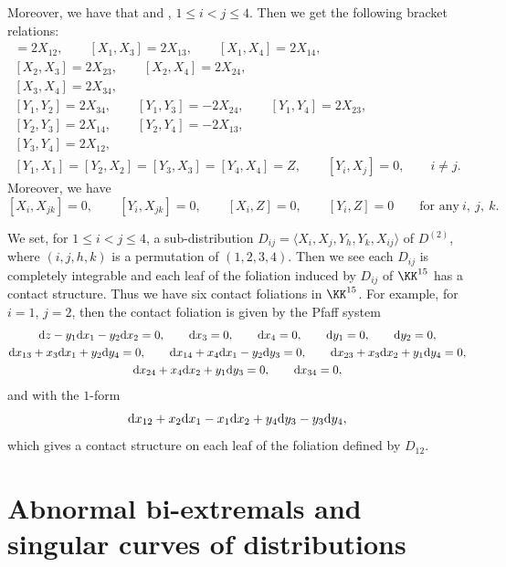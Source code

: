 Moreover, we have that
 and , $1 \leq i < j \leq 4$.
Then we get the following bracket relations:
\begin{gather*}
[X_1, X_2] = 2X_{12},\qquad [X_1, X_3] = 2X_{13},\qquad [X_1, X_4] = 2X_{14},
\\
 [X_2, X_3] = 2X_{23},\qquad [X_2, X_4] = 2X_{24},
\\
 [X_3, X_4] = 2X_{34},
\\
[Y_1, Y_2] = 2X_{34},\qquad [Y_1, Y_3] = -2X_{24},\qquad [Y_1, Y_4] = 2X_{23},
\\
 [Y_2, Y_3] = 2X_{14},\qquad [Y_2, Y_4] = -2X_{13},
\\
 [Y_3, Y_4] = 2X_{12},
\\
[Y_1, X_1] = [Y_2, X_2] = [Y_3, X_3] = [Y_4, X_4] = Z, \qquad [Y_i, X_j] = 0, \qquad i \not= j.
\end{gather*}
Moreover, we have
\[
[X_i, X_{jk}] = 0, \qquad [Y_i, X_{jk}] = 0, \qquad [X_i, Z] = 0, \qquad [Y_i, Z] = 0 \qquad \text{for any} \ i, \ j, \ k.
\]

\begin{Remark}
We set, for $1 \leq i < j \leq 4$, a sub-distribution
$D_{ij} = \langle X_i, X_j, Y_h, Y_k, X_{ij}\rangle$ of $D^{(2)}$, where $(i, j, h, k)$ is a permutation of $(1, 2, 3, 4)$.
Then we see each $D_{ij}$ is completely integrable
and each leaf of the foliation induced by $D_{ij}$ of $\KK^{15}$ has a contact structure.
Thus we have six contact foliations in $\KK^{15}$.
For example, for $i = 1$, $j = 2$, then the contact foliation is given by the Pfaff system
\begin{gather*}
{\rm d}z - y_1{\rm d}x_1 - y_2{\rm d}x_2 = 0,\qquad {\rm d}x_3 = 0,\qquad {\rm d}x_4 = 0,\qquad {\rm d}y_1 = 0,\qquad {\rm d}y_2 = 0,
\\
{\rm d}x_{13} + x_3{\rm d}x_1 + y_2{\rm d}y_4 = 0,\qquad {\rm d}x_{14} + x_4{\rm d}x_1 - y_2{\rm d}y_3 = 0,\qquad
{\rm d}x_{23} + x_3{\rm d}x_2 + y_1{\rm d}y_4 = 0,
\\
{\rm d}x_{24} + x_4{\rm d}x_2 + y_1{\rm d}y_3 = 0,\qquad {\rm d}x_{34} = 0,
\end{gather*}
and with the $1$-form
\[
{\rm d}x_{12} + x_2{\rm d}x_1 - x_1{\rm d}x_2 + y_4{\rm d}y_3 - y_3{\rm d}y_4,
\]
which gives a contact structure on each leaf of the foliation defined by $D_{12}$.
\end{Remark}

\section{Abnormal bi-extremals and singular curves of distributions}
\label{Abnormal-bi-extremals-general}

